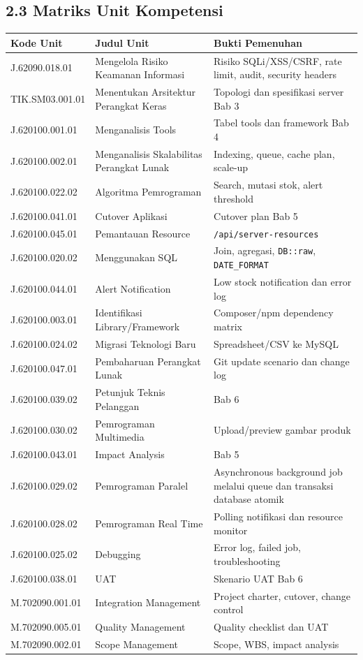 \documentclass[
]{article}
\begin{document}
\subsection{2.3 Matriks Unit
Kompetensi}\label{23-matriks-unit-kompetensi}

\begin{longtable}[]{@{}P{0.20\textwidth}P{0.26\textwidth}P{0.50\textwidth}@{}}
\toprule\noalign{}
Kode Unit & Judul Unit & Bukti Pemenuhan \\
\midrule\noalign{}
\endhead
\bottomrule\noalign{}
\endlastfoot
J.62090.018.01 & Mengelola Risiko Keamanan Informasi & Risiko
SQLi/XSS/CSRF, rate limit, audit, security headers \\
TIK.SM03.001.01 & Menentukan Arsitektur Perangkat Keras & Topologi dan
spesifikasi server Bab 3 \\
J.620100.001.01 & Menganalisis Tools & Tabel tools dan framework Bab
4 \\
J.620100.002.01 & Menganalisis Skalabilitas Perangkat Lunak & Indexing,
queue, cache plan, scale-up \\
J.620100.022.02 & Algoritma Pemrograman & Search, mutasi stok, alert
threshold \\
J.620100.041.01 & Cutover Aplikasi & Cutover plan Bab 5 \\
J.620100.045.01 & Pemantauan Resource &
\texttt{/api/server-resources} \\
J.620100.020.02 & Menggunakan SQL & Join, agregasi, \texttt{DB::raw},
\texttt{DATE\_FORMAT} \\
J.620100.044.01 & Alert Notification & Low stock notification dan error
log \\
J.620100.003.01 & Identifikasi Library/Framework & Composer/npm
dependency matrix \\
J.620100.024.02 & Migrasi Teknologi Baru & Spreadsheet/CSV ke MySQL \\
J.620100.047.01 & Pembaharuan Perangkat Lunak & Git update scenario dan
change log \\
J.620100.039.02 & Petunjuk Teknis Pelanggan & Bab 6 \\
J.620100.030.02 & Pemrograman Multimedia & Upload/preview gambar
produk \\
J.620100.043.01 & Impact Analysis & Bab 5 \\
J.620100.029.02 & Pemrograman Paralel & Asynchronous background job
melalui queue dan transaksi database atomik \\
J.620100.028.02 & Pemrograman Real Time & Polling notifikasi dan
resource monitor \\
J.620100.025.02 & Debugging & Error log, failed job, troubleshooting \\
J.620100.038.01 & UAT & Skenario UAT Bab 6 \\
M.702090.001.01 & Integration Management & Project charter, cutover,
change control \\
M.702090.005.01 & Quality Management & Quality checklist dan UAT \\
M.702090.002.01 & Scope Management & Scope, WBS, impact analysis \\
\end{longtable}
\end{document}
